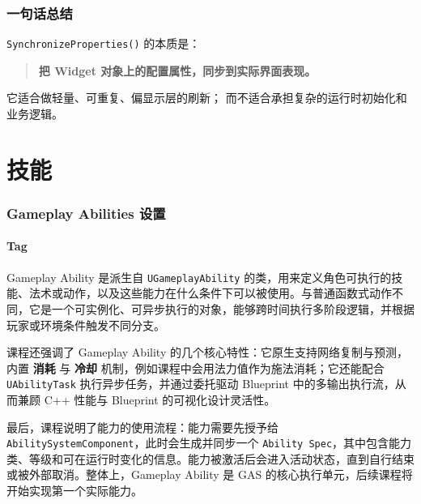 \documentclass[10pt,CJKmath]{ctexart}
\begin{document}
\section{一句话总结}

\texttt{SynchronizeProperties()} 的本质是：

\begin{quote}
	\textbf{把 Widget 对象上的配置属性，同步到实际界面表现。}
\end{quote}

它适合做轻量、可重复、偏显示层的刷新；  
而不适合承担复杂的运行时初始化和业务逻辑。

\part{技能}
\section{Gameplay Abilities 设置}
\subsection{Tag}
Gameplay Ability 是派生自 \texttt{UGameplayAbility} 的类，用来定义角色可执行的技能、法术或动作，以及这些能力在什么条件下可以被使用。与普通函数式动作不同，它是一个可实例化、可异步执行的对象，能够跨时间执行多阶段逻辑，并根据玩家或环境条件触发不同分支。

课程还强调了 Gameplay Ability 的几个核心特性：它原生支持网络复制与预测，内置 \textbf{消耗} 与 \textbf{冷却} 机制，例如课程中会用法力值作为施法消耗；它还能配合 \texttt{UAbilityTask} 执行异步任务，并通过委托驱动 Blueprint 中的多输出执行流，从而兼顾 C++ 性能与 Blueprint 的可视化设计灵活性。

最后，课程说明了能力的使用流程：能力需要先授予给 \texttt{AbilitySystemComponent}，此时会生成并同步一个 \texttt{Ability Spec}，其中包含能力类、等级和可在运行时变化的信息。能力被激活后会进入活动状态，直到自行结束或被外部取消。整体上，Gameplay Ability 是 GAS 的核心执行单元，后续课程将开始实现第一个实际能力。
\end{document}
